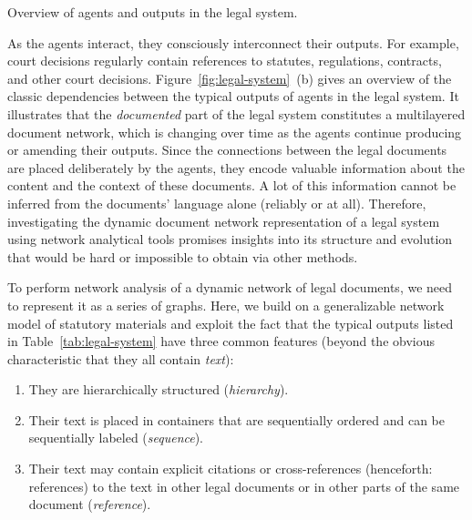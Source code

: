  \begin{table}
	\centering
	
	\caption{Overview of agents and outputs in the legal system.}\label{tab:legal-system}
\end{table}

As the agents interact, they consciously interconnect their outputs. 
For example, court decisions regularly contain references to statutes, regulations, contracts, and other court decisions.
Figure~\ref{fig:legal-system}~(b) gives an overview of the classic dependencies between the typical outputs of agents in the legal system.
It illustrates that the \emph{documented} part of the legal system constitutes a multilayered document network, 
which is changing over time as the agents continue producing or amending their outputs.
Since the connections between the legal documents are placed deliberately by the agents, they encode valuable information about the content and the context of these documents. 
A lot of this information cannot be inferred from the documents' language alone (reliably or at all).
Therefore, investigating the dynamic document network representation of a legal system using network analytical tools promises insights into its structure and evolution that would be hard or impossible to obtain via other methods. 

To perform network analysis of a dynamic network of legal documents, we need to represent it as a series of graphs. 
Here, we build on a generalizable network model of statutory materials \cite{katz2020} and exploit the fact that the typical outputs listed in Table~\ref{tab:legal-system} have three common features (beyond the obvious characteristic that they all contain \emph{text}):
\begin{enumerate}
    \item They are hierarchically structured (\emph{hierarchy}).
    \item Their text is placed in containers that are sequentially ordered and can be sequentially labeled (\emph{sequence}).
    \item Their text may contain explicit citations or cross-references (henceforth: references) to the text in other legal documents or in other parts of the same document (\emph{reference}).
\end{enumerate}


